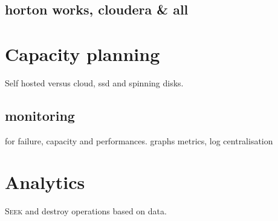 \documentclass[a4paper,12pt]{article}
\begin{document}
\subsection{horton works, cloudera \& all}
\section{Capacity planning}
Self hosted versus cloud, ssd and spinning disks.
\subsection{monitoring}
for failure, capacity and performances.
graphs metrics, log centralisation
\section{Analytics}
\lettrine{S}{eek} and destroy operations based on data.
\end{document}
